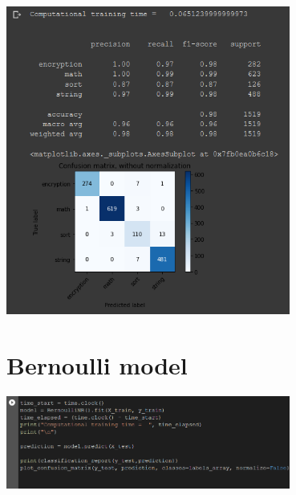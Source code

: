 \documentclass[11pt]{scrartcl}
\begin{document}
{\begin{center}
\vspace{0.1cm}
\hspace{+0.2in}\includegraphics[width=0.7\textwidth]{tree_matrix.png}
\vspace{0.3cm}
\end{center}

\newpage
\section{Bernoulli model}

\begin{center}
	\vspace{0.2cm}
	\hspace{+0.2in}\includegraphics[width=0.7\textwidth]{bernoulli.png}
	\vspace{0.1cm}
	

\end{center}}
\end{document}
